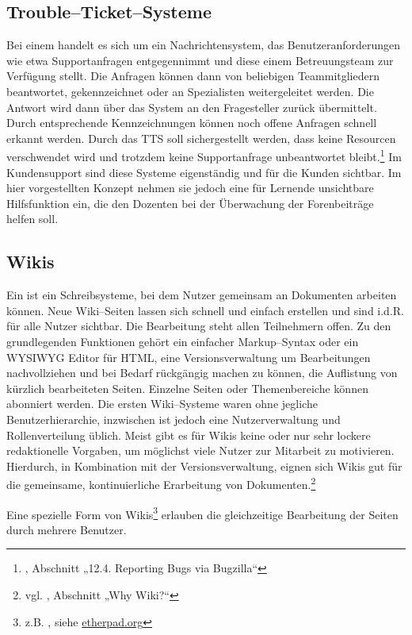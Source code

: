 \subsection{Trouble–Ticket–Systeme} %
\label{sub:trouble_ticket_systmee}
Bei einem  handelt es sich um ein Nachrichtensystem, das Benutzeranforderungen wie etwa Supportanfragen entgegennimmt und diese einem Betreuungsteam zur Verfügung stellt. Die Anfragen können dann von beliebigen Teammitgliedern beantwortet, gekennzeichnet oder an Spezialisten weitergeleitet werden. Die Antwort wird dann über das System an den Fragesteller zurück übermittelt. Durch entsprechende Kennzeichnungen können noch offene Anfragen schnell erkannt werden. Durch das \ac{TTS} soll sichergestellt werden, dass keine Resourcen verschwendet wird und trotzdem keine Supportanfrage unbeantwortet bleibt.\footnote{\cite{nna}, Abschnitt „12.4. Reporting Bugs via Bugzilla“} Im Kundensupport sind diese Systeme eigenständig und für die Kunden sichtbar. Im hier vorgestellten Konzept nehmen sie jedoch eine für Lernende unsichtbare Hilfsfunktion ein, die den Dozenten bei der Überwachung der Forenbeiträge helfen soll.

\subsection{Wikis} %
\label{sub:wikis}
Ein  ist ein Schreibsysteme, bei dem Nutzer gemeinsam an Dokumenten arbeiten können. Neue Wiki--Seiten lassen sich schnell und einfach erstellen und sind i.d.R. für alle Nutzer sichtbar. Die Bearbeitung steht allen Teilnehmern offen. Zu den grundlegenden Funktionen gehört ein einfacher Markup--Syntax oder ein \ac{WYSIWYG} Editor für \ac{HTML}, eine Versionsverwaltung um Bearbeitungen nachvollziehen und bei Bedarf rückgängig machen zu können, die Auflistung von kürzlich bearbeiteten Seiten. Einzelne Seiten oder Themenbereiche können abonniert werden. Die ersten Wiki--Systeme waren ohne jegliche Benutzerhierarchie, inzwischen ist jedoch eine Nutzerverwaltung und Rollenverteilung üblich. Meist gibt es für Wikis keine oder nur sehr lockere redaktionelle Vorgaben, um möglichst viele Nutzer zur Mitarbeit zu motivieren. Hierdurch, in Kombination mit der Versionsverwaltung, eignen sich Wikis gut für die gemeinsame, kontinuierliche Erarbeitung von Dokumenten.\footnote{vgl. \cite{cunningham}, Abschnitt „Why Wiki?“}

Eine spezielle Form von Wikis\footnote{z.B. , siehe \url{etherpad.org}} erlauben die gleichzeitige Bearbeitung der Seiten durch mehrere Benutzer.

